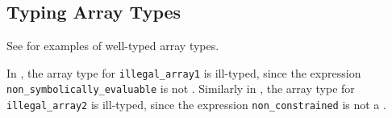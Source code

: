 
\begin{mathpar}
\end{mathpar}
\subsection{Typing Array Types\label{sec:TypingArrayTypes}}
See  for examples of well-typed
array types.

In , the array type for \verb|illegal_array1|
is ill-typed, since the expression \verb|non_symbolically_evaluable|
is not \symbolicallyevaluableterm{}.
Similarly in , the array type for \verb|illegal_array2| is ill-typed, since the expression \verb|non_constrained| is not a \constrainedintegerterm{}.


